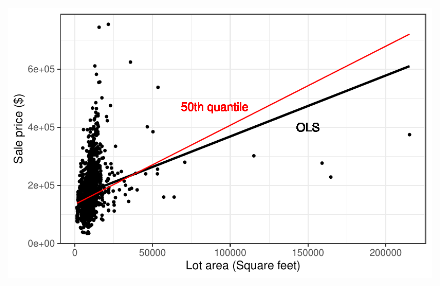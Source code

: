 \documentclass[
  letterpaper,
  DIV=11,
  numbers=noendperiod]{scrreprt}
\begin{document}
\begin{figure}[H]

{\centering \includegraphics{analysis_files/figure-pdf/Visualizing housing-1.pdf}

}

\end{figure}
\end{document}
